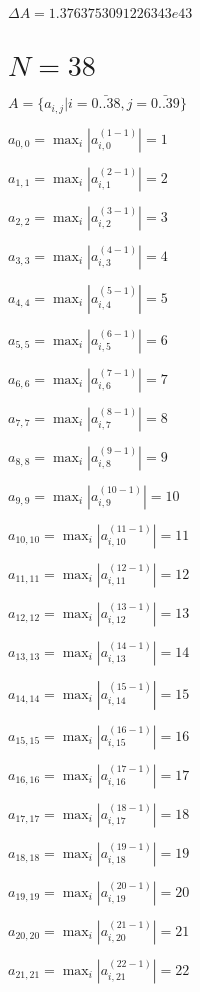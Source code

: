 \documentclass[a4paper,12pt]{article}
\begin{document}
$\Delta A = 1.3763753091226343e43$



\section{ $N = 38$ }
$A = \{ a _{ i, j } | i = \bar { 0..38 }, j = \bar { 0..39 } \}$

$a _{ 0, 0 } =  \max _i |a _{ i, 0 } ^{ (1 - 1) } | = 1$

$a _{ 1, 1 } =  \max _i |a _{ i, 1 } ^{ (2 - 1) } | = 2$

$a _{ 2, 2 } =  \max _i |a _{ i, 2 } ^{ (3 - 1) } | = 3$

$a _{ 3, 3 } =  \max _i |a _{ i, 3 } ^{ (4 - 1) } | = 4$

$a _{ 4, 4 } =  \max _i |a _{ i, 4 } ^{ (5 - 1) } | = 5$

$a _{ 5, 5 } =  \max _i |a _{ i, 5 } ^{ (6 - 1) } | = 6$

$a _{ 6, 6 } =  \max _i |a _{ i, 6 } ^{ (7 - 1) } | = 7$

$a _{ 7, 7 } =  \max _i |a _{ i, 7 } ^{ (8 - 1) } | = 8$

$a _{ 8, 8 } =  \max _i |a _{ i, 8 } ^{ (9 - 1) } | = 9$

$a _{ 9, 9 } =  \max _i |a _{ i, 9 } ^{ (10 - 1) } | = 10$

$a _{ 10, 10 } =  \max _i |a _{ i, 10 } ^{ (11 - 1) } | = 11$

$a _{ 11, 11 } =  \max _i |a _{ i, 11 } ^{ (12 - 1) } | = 12$

$a _{ 12, 12 } =  \max _i |a _{ i, 12 } ^{ (13 - 1) } | = 13$

$a _{ 13, 13 } =  \max _i |a _{ i, 13 } ^{ (14 - 1) } | = 14$

$a _{ 14, 14 } =  \max _i |a _{ i, 14 } ^{ (15 - 1) } | = 15$

$a _{ 15, 15 } =  \max _i |a _{ i, 15 } ^{ (16 - 1) } | = 16$

$a _{ 16, 16 } =  \max _i |a _{ i, 16 } ^{ (17 - 1) } | = 17$

$a _{ 17, 17 } =  \max _i |a _{ i, 17 } ^{ (18 - 1) } | = 18$

$a _{ 18, 18 } =  \max _i |a _{ i, 18 } ^{ (19 - 1) } | = 19$

$a _{ 19, 19 } =  \max _i |a _{ i, 19 } ^{ (20 - 1) } | = 20$

$a _{ 20, 20 } =  \max _i |a _{ i, 20 } ^{ (21 - 1) } | = 21$

$a _{ 21, 21 } =  \max _i |a _{ i, 21 } ^{ (22 - 1) } | = 22$
\end{document}
